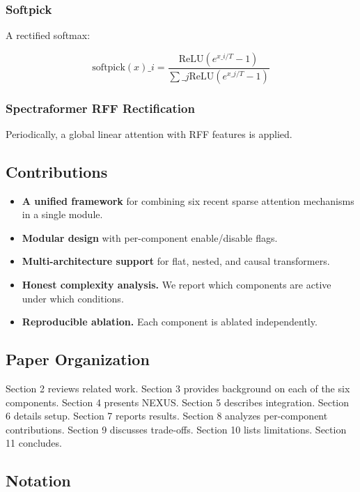 \subsubsection{Softpick}

A rectified softmax:

\[
\text{softpick}(x)\_i = \frac{\text{ReLU}(e^{x\_i/T} - 1)}{\sum\_j \text{ReLU}(e^{x\_j/T} - 1)}
\tag{1.4}
\]

\subsubsection{Spectraformer RFF Rectification}

Periodically, a global linear attention with RFF features is applied.

\subsection{Contributions}

\begin{itemize}
\item \textbf{A unified framework} for combining six recent sparse attention
  mechanisms in a single module.
\item \textbf{Modular design} with per-component enable/disable flags.
\item \textbf{Multi-architecture support} for flat, nested, and causal transformers.
\item \textbf{Honest complexity analysis.} We report which components are active under
  which conditions.
\item \textbf{Reproducible ablation.} Each component is ablated independently.

\end{itemize}
\subsection{Paper Organization}

Section 2 reviews related work. Section 3 provides background on each of 
the six components. Section 4 presents NEXUS. Section 5 describes 
integration. Section 6 details setup. Section 7 reports results. Section 8 
analyzes per-component contributions. Section 9 discusses trade-offs. 
Section 10 lists limitations. Section 11 concludes.



\subsection{Notation}

